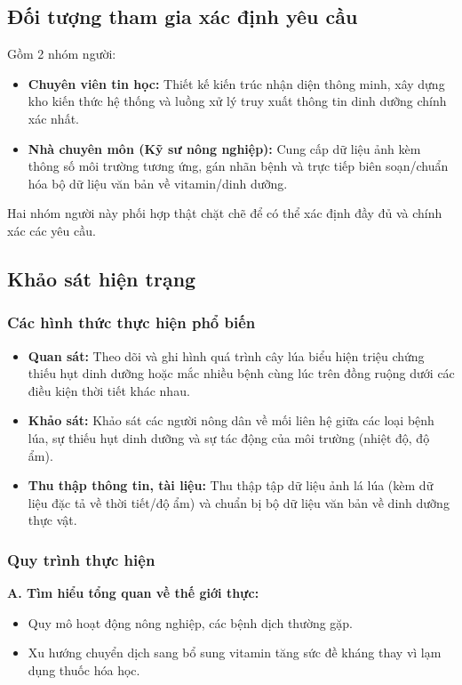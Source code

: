 \documentclass[12pt,a4paper]{article}
\begin{document}
\subsection{Đối tượng tham gia xác định yêu cầu}
Gồm 2 nhóm người:
\begin{itemize}
    \item \textbf{Chuyên viên tin học:} Thiết kế kiến trúc nhận diện thông minh, xây dựng kho kiến thức hệ thống và luồng xử lý truy xuất thông tin dinh dưỡng chính xác nhất.
    \item \textbf{Nhà chuyên môn (Kỹ sư nông nghiệp):} Cung cấp dữ liệu ảnh kèm thông số môi trường tương ứng, gán nhãn bệnh và trực tiếp biên soạn/chuẩn hóa bộ dữ liệu văn bản về vitamin/dinh dưỡng.
\end{itemize}
Hai nhóm người này phối hợp thật chặt chẽ để có thể xác định đầy đủ và chính xác các yêu cầu.

\hrulefill

\subsection{Khảo sát hiện trạng}

\subsubsection{Các hình thức thực hiện phổ biến}
\begin{itemize}
    \item \textbf{Quan sát:} Theo dõi và ghi hình quá trình cây lúa biểu hiện triệu chứng thiếu hụt dinh dưỡng hoặc mắc nhiều bệnh cùng lúc trên đồng ruộng dưới các điều kiện thời tiết khác nhau.
    \item \textbf{Khảo sát:} Khảo sát các người nông dân về mối liên hệ giữa các loại bệnh lúa, sự thiếu hụt dinh dưỡng và sự tác động của môi trường (nhiệt độ, độ ẩm).
    \item \textbf{Thu thập thông tin, tài liệu:} Thu thập tập dữ liệu ảnh lá lúa (kèm dữ liệu đặc tả về thời tiết/độ ẩm) và chuẩn bị bộ dữ liệu văn bản về dinh dưỡng thực vật.
\end{itemize}

\subsubsection{Quy trình thực hiện}
\textbf{A. Tìm hiểu tổng quan về thế giới thực:}
\begin{itemize}
    \item Quy mô hoạt động nông nghiệp, các bệnh dịch thường gặp.
    \item Xu hướng chuyển dịch sang bổ sung vitamin tăng sức đề kháng thay vì lạm dụng thuốc hóa học.
\end{itemize}
\end{document}
